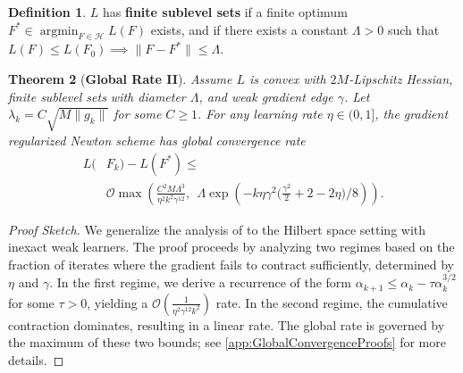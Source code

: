 \documentclass{article}
\theoremstyle{plain}
\newtheorem{theorem}{Theorem}[section]
\theoremstyle{definition}
\newtheorem{definition}[theorem]{Definition}
\theoremstyle{remark}
\DeclareMathOperator*{\argmin}{argmin}
\begin{document}
\begin{definition}
    $L$ has \textbf{finite sublevel sets} if a finite optimum $F^* \in \argmin_{F \in \mathcal{H}} L(F)$ exists, and if there exists a constant $\Lambda>0$ such that $L(F) \leq L(F_0) \implies \|F-F^*\| \leq \Lambda$.
\end{definition}

\begin{theorem}[\textbf{Global Rate II}]\label{thm:global_rate_II}
    Assume $L$ is convex with $2M$-Lipschitz Hessian, finite sublevel sets with diameter $\Lambda$, and weak gradient edge $\gamma$. Let $\lambda_k = C\sqrt{M\|g_k\|}$ for some $C\geq 1$. For any learning rate $\eta \in (0,1]$, the gradient regularized Newton scheme has global convergence rate
    \begin{align*}
        L(&F_k) - L(F^*) \leq \\
        &\mathcal{O}\max\left(\frac{C^2 M \Lambda^3}{\eta^2 k^2 \gamma^{12}},\:\: \Lambda\exp\left(-k\eta\gamma^2\big(\frac{\gamma^2}{2}+2-2\eta\big) / 8\right)\right).
    \end{align*}
\end{theorem}
\begin{proof}[Proof Sketch] We generalize the analysis of \citet{2023RegularizedNewtonMethodWithGlobalConvergence} to the Hilbert space setting with inexact weak learners. The proof proceeds by analyzing two regimes based on the fraction of iterates where the gradient fails to contract sufficiently, determined by $\eta$ and $\gamma$. In the first regime, we derive a recurrence of the form $\alpha_{k+1} \leq \alpha_k - \tau \alpha_k^{3/2}$ for some $\tau > 0$, yielding a $\mathcal{O}(\frac{1}{\eta^2 \gamma^{12} k^2})$ rate. In the second regime, the cumulative contraction dominates, resulting in a linear rate. The global rate is governed by the maximum of these two bounds; see \cref{app:GlobalConvergenceProofs} for more details.
\end{proof}
\end{document}
